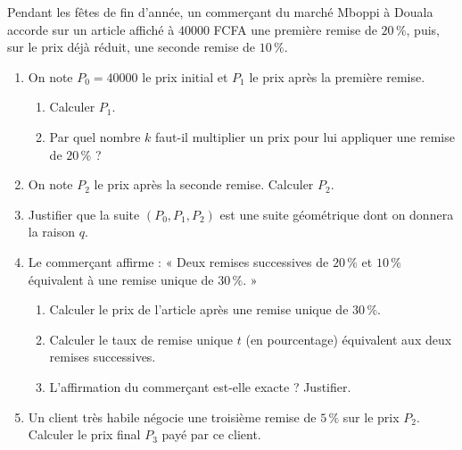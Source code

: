 \documentclass[11pt]{article}
\begin{document}
\begin{exercice}
Pendant les fêtes de fin d'année, un commerçant du marché Mboppi à Douala accorde sur un article affiché à $\num{40000}$ FCFA une première remise de $20\,\%$, puis, sur le prix déjà réduit, une seconde remise de $10\,\%$.
\begin{enumerate}
\item On note $P_0 = \num{40000}$ le prix initial et $P_1$ le prix après la première remise.
\begin{enumerate}
\item Calculer $P_1$.
\item Par quel nombre $k$ faut-il multiplier un prix pour lui appliquer une remise de $20\,\%$ ?
\end{enumerate}
\item On note $P_2$ le prix après la seconde remise. Calculer $P_2$.
\item Justifier que la suite $(P_0, P_1, P_2)$ est une suite géométrique dont on donnera la raison $q$.
\item Le commerçant affirme : « Deux remises successives de $20\,\%$ et $10\,\%$ équivalent à une remise unique de $30\,\%$. »
\begin{enumerate}
\item Calculer le prix de l'article après une remise unique de $30\,\%$.
\item Calculer le taux de remise unique $t$ (en pourcentage) équivalent aux deux remises successives.
\item L'affirmation du commerçant est-elle exacte ? Justifier.
\end{enumerate}
\item Un client très habile négocie une troisième remise de $5\,\%$ sur le prix $P_2$. Calculer le prix final $P_3$ payé par ce client.
\end{enumerate}
\end{exercice}
\end{document}
